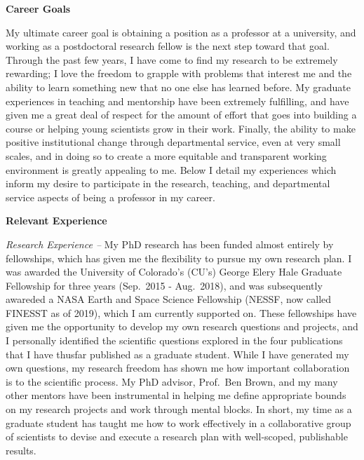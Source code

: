 \documentclass[onecolumn, 11pt, hmargin=1in, vmargin=1in]{aastex62}
\begin{document}
\thispagestyle{fancy}
\begin{center}
\vspace{-1.4in}
\textbf{Career Goals}
\vspace{-6pt}
\end{center}
My ultimate career goal is obtaining a position as a professor at a university, and working as a postdoctoral research fellow is the next step toward that goal.
Through the past few years, I have come to find my research to be extremely rewarding; I love the freedom to grapple with problems that interest me and the ability to learn something new that no one else has learned before.
My graduate experiences in teaching and mentorship have been extremely fulfilling, and have given me a great deal of respect for the amount of effort that goes into building a course or helping young scientists grow in their work.
Finally, the ability to make positive institutional change through departmental service, even at very small scales, and in doing so to create a more equitable and transparent working environment is greatly appealing to me.
Below I detail my experiences which inform my desire to participate in the research, teaching, and departmental service aspects of being a professor in my career.

\begin{center}
\textbf{Relevant Experience}
\vspace{-6pt}
\end{center}
\emph{Research Experience --}
My PhD research has been funded almost entirely by fellowships, which has given me the flexibility to pursue my own research plan.
I was awarded the University of Colorado's (CU's) George Elery Hale Graduate Fellowship for three years (Sep.~2015 - Aug.~2018), and was subsequently awareded a NASA Earth and Space Science Fellowship (NESSF, now called FINESST as of 2019), which I am currently supported on.
These fellowships have given me the opportunity to develop my own research questions and projects, and I personally identified the scientific questions explored in the four publications that I have thusfar published as a graduate student.
While I have generated my own questions, my research freedom has shown me how important collaboration is to the scientific process.
My PhD advisor, Prof.~Ben Brown, and my many other mentors have been instrumental in helping me define appropriate bounds on my research projects and work through mental blocks.
In short, my time as a graduate student has taught me how to work effectively in a collaborative group of scientists to devise and execute a research plan with well-scoped, publishable results.
\end{document}
